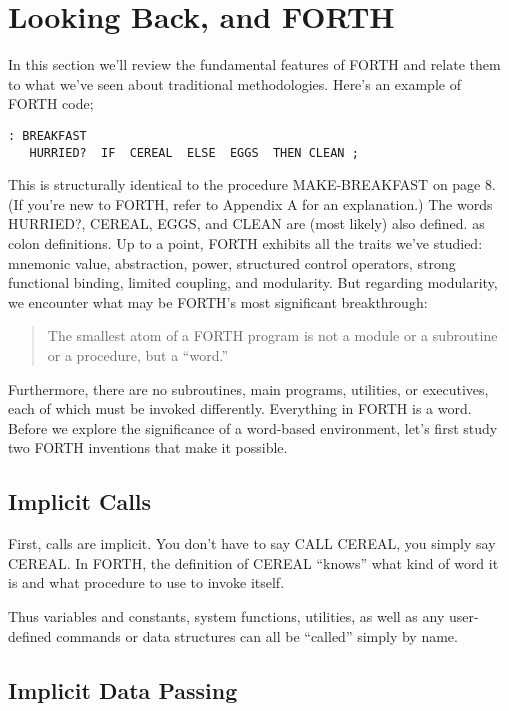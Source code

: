 \section{Looking Back, and FORTH}

In this section we'll review the fundamental features of FORTH and
relate them to what we've seen about traditional methodologies. Here's
an example of FORTH code;

\begin{verbatim}
: BREAKFAST
   HURRIED?  IF  CEREAL  ELSE  EGGS  THEN CLEAN ;
\end{verbatim}
This is structurally identical to the procedure MAKE-BREAKFAST on
page 8. (If you're new to FORTH, refer to Appendix A for an explanation.)
The words HURRIED?, CEREAL, EGGS, and CLEAN are (most likely) also
defined. as colon definitions. Up to a point, FORTH exhibits all the
traits we've studied: mnemonic value, abstraction, power, structured
control operators, strong functional binding, limited coupling, and
modularity. But regarding modularity, we encounter what may be FORTH's
most significant breakthrough:

\begin{quote}
The smallest atom of a FORTH program is not a module or a subroutine
or a procedure, but a {}``word.''
\end{quote}
Furthermore, there are no subroutines, main programs, utilities, or
executives, each of which must be invoked differently. Everything
in FORTH is a word. Before we explore the significance of a word-based
environment, let's first study two FORTH inventions that make it possible.


\subsection{Implicit Calls}

First, calls are implicit. You don't have to say CALL CEREAL, you
simply say CEREAL. In FORTH, the definition of CEREAL {}``knows''
what kind of word it is and what procedure to use to invoke itself.

Thus variables and constants, system functions, utilities, as well
as any user-defined commands or data structures can all be {}``called''
simply by name.


\subsection{Implicit Data Passing}

